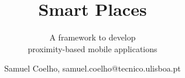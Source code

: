 \documentclass{./llncs2e/llncs}
\begin{document}
\title{Smart Places}

\subtitle{A framework to develop \\ proximity-based mobile applications}
\author{Samuel Coelho, samuel.coelho@tecnico.ulisboa.pt}

\maketitle

\setcounter{tocdepth}{2}
\makeatletter
\renewcommand*\l@author[2]{}
\renewcommand*\l@title[2]{}
\makeatletter

\afterpage{\cleardoublepage}


\tableofcontents

\afterpage{\cleardoublepage}


\newpage


\afterpage{\cleardoublepage}



\afterpage{\cleardoublepage}

\afterpage{\cleardoublepage}

\afterpage{\cleardoublepage}

\afterpage{\cleardoublepage}

\afterpage{\cleardoublepage}

\afterpage{\cleardoublepage}
\appendix





\end{document}
